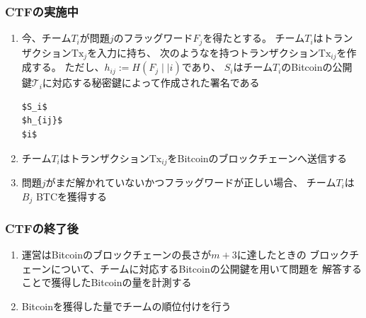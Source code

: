 \begin{frame}[fragile]
  \frametitle{CTFの実施中}

  \pause
  \begin{enumerate}
    \item<+-> 今、チーム$T_i$が問題$j$のフラッグワード$F_j$を得たとする。
    チーム$T_i$はトランザクション$\text{Tx}_{j}$を入力に持ち、
    次のような\ScriptSig を持つトランザクション$\text{Tx}_{ij}$を作成する。
    ただし、$h_{ij} := H(F_j \mid\mid i)$であり、
    $S_i$はチーム$T_i$のBitcoinの公開鍵$\mathcal{T}_i$に対応する秘密鍵によって作成された署名である
\begin{lstlisting}[style=bitcoin-script, caption={$\text{Tx}_{ij}$の\ScriptSig}]
$S_i$
$h_{ij}$
$i$
\end{lstlisting}

    \item<+-> チーム$T_i$はトランザクション$\text{Tx}_{ij}$をBitcoinのブロックチェーンへ送信する
    \item<+-> 問題$j$がまだ解かれていないかつフラッグワードが正しい場合、
    チーム$T_i$は$B_j$ BTCを獲得する
  \end{enumerate}
\end{frame}

\begin{frame}
  \frametitle{CTFの終了後}

  \pause
  \begin{enumerate}
    \item<+-> 運営はBitcoinのブロックチェーンの長さが$m + 3$に達したときの
    ブロックチェーンについて、チームに対応するBitcoinの公開鍵を用いて問題を
    解答することで獲得したBitcoinの量を計測する

    \item<+-> Bitcoinを獲得した量でチームの順位付けを行う
  \end{enumerate}
\end{frame}

